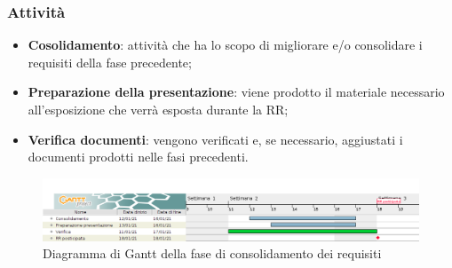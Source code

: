 \documentclass[../piano_di_progetto.tex]{subfiles}
\begin{document}
\subsubsection{Attività}
\begin{itemize}
    \item \textbf{Cosolidamento}: attività che ha lo scopo di migliorare e/o consolidare i requisiti della fase precedente;
    \item \textbf{Preparazione della presentazione}: viene prodotto il materiale necessario all'esposizione che verrà esposta durante la RR;
    \item \textbf{Verifica documenti}: vengono verificati e, se necessario, aggiustati i documenti prodotti nelle fasi precedenti. 
\end{itemize}



\begin{figure}[H]
\centering
\includegraphics[width=18cm]{src/img/gantt/4_2_consolidamento_dei_requisiti.png}
\caption{ Diagramma di Gantt della fase di consolidamento dei requisiti}
\end{figure}

%
\end{document}
